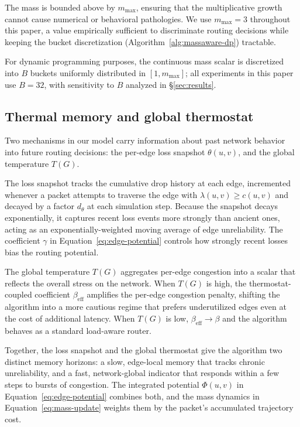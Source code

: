 The mass is bounded above by $m_{\max}$, ensuring that the
multiplicative growth cannot cause numerical or behavioral
pathologies. We use $m_{\max}=3$ throughout this paper, a value
empirically sufficient to discriminate routing decisions while
keeping the bucket discretization (Algorithm~\ref{alg:massaware-dp})
tractable.

For dynamic programming purposes, the continuous mass scalar is
discretized into $B$ buckets uniformly distributed in $[1, m_{\max}]$;
all experiments in this paper use $B=32$, with sensitivity to $B$
analyzed in \S\ref{sec:results}.

\subsection{Thermal memory and global thermostat}
\label{subsec:thermal-memory}

Two mechanisms in our model carry information about past network
behavior into future routing decisions: the per-edge loss snapshot
$\theta(u,v)$, and the global temperature $T(G)$.

The loss snapshot tracks the cumulative drop history at each edge,
incremented whenever a packet attempts to traverse the edge with
$\lambda(u,v)\ge c(u,v)$ and decayed by a factor $d_\theta$ at each
simulation step. Because the snapshot decays exponentially, it
captures recent loss events more strongly than ancient ones,
acting as an exponentially-weighted moving average of edge
unreliability. The coefficient $\gamma$ in
Equation~\ref{eq:edge-potential} controls how strongly recent
losses bias the routing potential.

The global temperature $T(G)$ aggregates per-edge congestion into
a scalar that reflects the overall stress on the network. When
$T(G)$ is high, the thermostat-coupled coefficient
$\beta_{\text{eff}}$ amplifies the per-edge congestion penalty,
shifting the algorithm into a more cautious regime that prefers
underutilized edges even at the cost of additional latency. When
$T(G)$ is low, $\beta_{\text{eff}}\to\beta$ and the algorithm
behaves as a standard load-aware router.

Together, the loss snapshot and the global thermostat give the
algorithm two distinct memory horizons: a slow, edge-local memory
that tracks chronic unreliability, and a fast, network-global
indicator that responds within a few steps to bursts of
congestion. The integrated potential $\Phi(u,v)$ in
Equation~\ref{eq:edge-potential} combines both, and the
mass dynamics in Equation~\ref{eq:mass-update} weights them by the
packet's accumulated trajectory cost.

